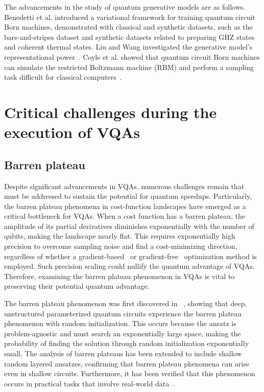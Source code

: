 \documentclass[12pt,dvipdfmx,twoside,openright]{report}
\begin{document}
The advancements in the study of quantum generative models are as follows.
Benedetti et al. introduced a variational framework for training quantum circuit Born machines, demonstrated with classical and synthetic datasets, such as the bars-and-stripes dataset and synthetic datasets related to preparing GHZ states and coherent thermal states\cite{born-machine}.
Liu and Wang investigated the generative model's representational power~\cite{q-generative2}.
Coyle et al. showed that quantum circuit Born machines can simulate the restricted Boltzmann machine (RBM) and perform a sampling task difficult for classical computers~\cite{q-generative3}.


\section{Critical challenges during the execution of VQAs}



\subsection{Barren plateau}
Despite significant advancements in VQAs, numerous challenges remain that must be addressed to sustain the potential for quantum speedups.
Particularly, the barren plateau phenomena in cost-function landscapes have emerged as a critical bottleneck for VQAs.
When a cost function has a barren plateau, the amplitude of its partial derivatives diminishes exponentially with the number of qubits, making the landscape nearly flat.
This requires exponentially high precision to overcome sampling noise and find a cost-minimizing direction, regardless of whether a gradient-based~\cite{gradient-based} or gradient-free~\cite{gradient-free} optimization method is employed.
Such precision scaling could nullify the quantum advantage of VQAs.
Therefore, examining the barren plateau phenomenon in VQAs is vital to preserving their potential quantum advantage.

The barren plateau phenomenon was first discovered in ~\cite{barrenplateau1}, showing that deep, unstructured parameterized quantum circuits experience the barren plateau phenomenon with random initialization.
This occurs because the ansatz is problem-agnostic and must search an exponentially large space, making the probability of finding the solution through random initialization exponentially small.
The analysis of barren plateaus has been extended to include shallow random layered ansatzes, confirming that barren plateau phenomena can arise even in shallow circuits.
Furthermore, it has been verified that this phenomenon occurs in practical tasks that involve real-world data~\cite{barren-generic0,barren-generic1,barren-generic2}.
\end{document}
